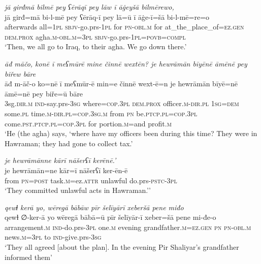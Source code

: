 \ea \label{BP.56}
\textit{jā girđmā bilmē pey ʕērāqī pey lāw ī āġeyšā bilmērewo,} \\ 
\gll jā girđ=mā bi-l-mē pey ʕērāq-ī pey lā=ū ī āġe-ī=šā bi-l-mē=re=o \\ 
 afterwards all\textsc{=\textsc{1pl}} \textsc{sbjv-}go.prs\textsc{-\textsc{1pl}} for \textsc{pn}\textsc{-obl}\textsc{.m} for at\_the\_place\_of\textsc{=ez.gen} \textsc{dem.prox} agha\textsc{.m}\textsc{-obl}\textsc{.m}\textsc{=3pl} \textsc{sbjv-}go.prs\textsc{-\textsc{1pl}}\textsc{=\textsc{povb}}\textsc{=compl} \\ 
\glt `Then, we all go to Iraq, to their agha. We go down there.'
\z 
 
\ea \label{BP.57}
\textit{āđ māčo, konē ī meʕmūrē mine činnē wextēn? je hewrāmān bīyēnē āmēnē pey biřew bāre} \\ 
\gll āđ m-āč-o ko=nē ī meʕmūr-ē min=e činnē wext-ē=n je hewrāmān bīyē=nē āmē=nē pey biře=ū bāre \\ 
 3sg\textsc{.dir}\textsc{.m} \textsc{ind-}say.prs\textsc{-3sg} where\textsc{=cop}\textsc{.3pl} \textsc{dem.prox} officer\textsc{.m}\textsc{-dir}\textsc{.pl} \textsc{1sg}\textsc{=dem} some\textsc{.pl} time\textsc{.m}\textsc{-dir}\textsc{.pl}\textsc{=cop}\textsc{.3sg}\textsc{.m} from \textsc{pn} be\textsc{.ptcp}\textsc{.pl}\textsc{=cop}\textsc{.3pl} come\textsc{.pst}\textsc{.ptcp}\textsc{.pl}\textsc{=cop}\textsc{.3pl} for portion\textsc{.m}=and profit\textsc{.m} \\ 
\glt `He (the agha) says, ‘where have my officers been during this time? They were in Hawraman; they had gone to collect tax.'
\z 
 
\ea \label{BP.62}
\textit{je hewrāmānne kārī nāšerʕī kerēnē.’} \\ 
\gll je hewrāmān=ne kār=ī nāšerʕī ker-ēn-ē \\ 
 from \textsc{pn}\textsc{=\textsc{post}} task\textsc{.m}=ez.\textsc{attr} unlawful do.prs\textsc{-pstc}\textsc{-3pl} \\ 
\glt `They committed unlawful acts in Hawraman.’'
\z 
 
\ea \label{BP.65}
\textit{qewɫ kerā yo, wēregā bābāw pīr šelīyārī xeberšā pene miđo} \\ 
\gll qewɫ ∅-ker-ā yo wēregā bābā=ū pīr šelīyār-ī xeber=šā pene mi-đe-o \\ 
 arrangement\textsc{.m} \textsc{ind-}do.prs\textsc{-3pl} one\textsc{.m} evening grandfather\textsc{.m}\textsc{=ez.gen} \textsc{pn} \textsc{pn}\textsc{-obl}\textsc{.m} news\textsc{.m}\textsc{=3pl} to \textsc{ind-}give.prs\textsc{-3sg} \\ 
\glt `They all agreed [about the plan]. In the evening Pir Shaliyar’s grandfather informed them'
\z 
 
